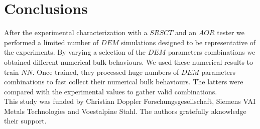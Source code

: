 \section{Conclusions}
\label{sec:conclusions}
After the experimental characterization with a $SRSCT$ and an $AOR$ tester we performed a 
limited number of $DEM$ simulations designed to be representative of the experiments. 
By varying a selection of the $DEM$ parameters combinations we obtained different numerical bulk behaviours. 
We used these numerical results to train $NN$. Once trained, they processed huge 
numbers of $DEM$ parameters combinations to fast collect their numerical bulk behaviours. 
The latters were compared with the experimental values to gather valid
combinations. \\

This study was funded by Christian Doppler Forschungsgesellschaft, Siemens VAI Metals Technologies and Voestalpine Stahl. The authors gratefully aknowledge their support.

